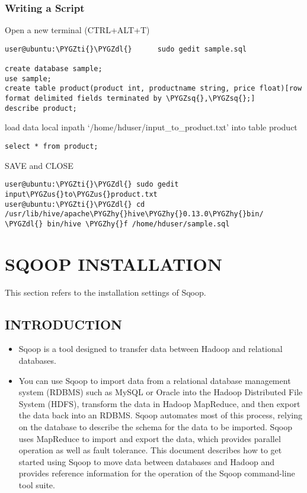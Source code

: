 \documentclass[letterpaper,10pt,english]{sphinxmanual}
\def\PYGZus{\char`\_}
\def\PYGZdl{\char`\$}
\def\PYGZhy{\char`\-}
\def\PYGZsq{\char`\'}
\def\PYGZti{\char`\~}
\begin{document}
\subsection{Writing a Script}
\label{hive:writing-a-script}
Open a new terminal (CTRL+ALT+T)

\begin{Verbatim}[commandchars=\\\{\}]
user@ubuntu:\PYGZti{}\PYGZdl{}      sudo gedit sample.sql

create database sample;
use sample;
create table product(product int, productname string, price float)[row format delimited fields terminated by \PYGZsq{},\PYGZsq{};]
describe product;
\end{Verbatim}

load data local inpath `/home/hduser/input\_to\_product.txt' into table product

\begin{Verbatim}[commandchars=\\\{\}]
select * from product;
\end{Verbatim}

SAVE and CLOSE

\begin{Verbatim}[commandchars=\\\{\}]
user@ubuntu:\PYGZti{}\PYGZdl{} sudo gedit input\PYGZus{}to\PYGZus{}product.txt
user@ubuntu:\PYGZti{}\PYGZdl{} cd /usr/lib/hive/apache\PYGZhy{}hive\PYGZhy{}0.13.0\PYGZhy{}bin/ \PYGZdl{} bin/hive \PYGZhy{}f /home/hduser/sample.sql
\end{Verbatim}


\chapter{SQOOP INSTALLATION}
\label{sqoop::doc}\label{sqoop:sqoop-installation}
This section refers to the installation settings of Sqoop.


\section{INTRODUCTION}
\label{sqoop:introduction}\begin{itemize}
\item {} 
Sqoop is a tool designed to transfer data between Hadoop and relational databases.

\item {} 
You can use Sqoop to import data from a relational database management system (RDBMS) such as MySQL or Oracle into the Hadoop Distributed File System (HDFS), transform the data in Hadoop MapReduce, and then export the data back into an RDBMS. Sqoop automates most of this process, relying on the database to describe the schema for the data to be imported. Sqoop uses MapReduce to import and export the data, which provides parallel operation as well as fault tolerance. This document describes how to get started using Sqoop to move data between databases and Hadoop and provides reference information for the operation of the Sqoop command-line tool suite.

\end{itemize}
\end{document}
